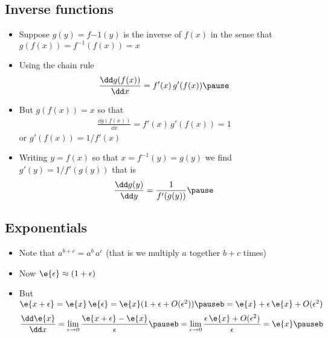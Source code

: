 \begin{slide}
\section{Inverse functions}

\begin{PauseHighLight}
  \begin{itemize}
  \item Suppose $g(y) = f{-1}(y)$ is the inverse of $f(x)$ in the sense that
    $g(f(x)) = f^{-1}(f(x))=x$\pause
  \item Using the chain rule
    \begin{align*}
      \frac{\dd g(f(x))}{\dd x} = f'(x)\, g'(f(x))\pause
    \end{align*}
  \item But $g(f(x))= x$ so that
     \begin{align*}
      \frac{\dd g(f(x))}{\dd x} = f'(x)\, g'(f(x))=1
    \end{align*}
     or $g'(f(x))= 1/f'(x)$\pause
   \item Writing $y=f(x)$ so that $x=f^{-1}(y) = g(y)$ we find $g'(y)
     = 1/f'(g(y))$ that is
     \begin{align*}
       \frac{\dd g(y)}{\dd y} = \frac{1}{f'(g(y))}\pause
     \end{align*}
  \end{itemize}
\end{PauseHighLight}


\end{slide}




\begin{slide}
  \section{Exponentials}

\begin{PauseHighLight}
  \begin{itemize}
  \item Note that $a^{b+c} = a^b \, a^c$ (that is we multiply $a$
    together $b+c$ times)\pauseb
  \item Now $\e{\epsilon} \approx (1+\epsilon) $\hfil\hfil {}\pauseb
  \item But $\e{x+\epsilon} = \e{x}\,\e{\epsilon} = \e{x}(1+\epsilon +
    O(\epsilon^2))\pauseb = \e{x} + \epsilon\,\e{x}+ O(\epsilon^2)$\pauseb
    \begin{align*}
      \frac{\dd \e{x}}{\dd x} = \lim_{\epsilon\rightarrow 0}
      \frac{\e{x+\epsilon}-\e{x}}{\epsilon}\pauseb
      =  \lim_{\epsilon\rightarrow 0} \frac{\epsilon\,\e{x} +
      O(\epsilon^2)}{\epsilon} = \e{x}\pauseb
    \end{align*}
  \end{itemize}
\end{PauseHighLight}

\end{slide}

